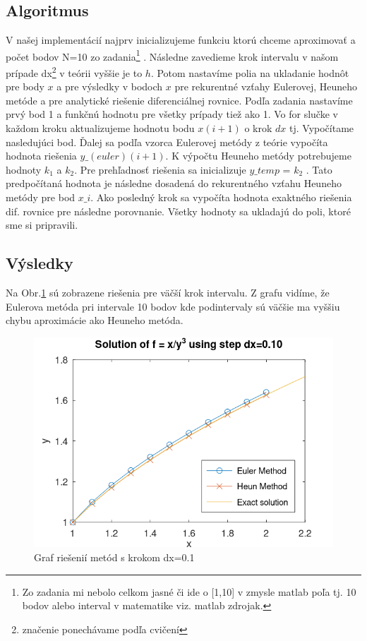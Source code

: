 \documentclass{article}
\theoremstyle{definition}
\theoremstyle{remark}
\begin{document}
\subsection{Algoritmus}
V našej implementácií najprv inicializujeme funkciu ktorú chceme aproximovať a počet bodov N=10 zo zadania\footnote{Zo zadania mi nebolo celkom jasné či ide o [1,10] v zmysle matlab poľa tj. 10 bodov alebo interval v matematike viz. matlab zdrojak.} . Následne zavedieme krok intervalu v našom prípade dx\footnote{značenie ponechávame podľa cvičení} v teórii vyššie je to $h$. Potom nastavíme polia na ukladanie hodnôt pre body $x$ a pre výsledky v bodoch $x$ pre rekurentné vzťahy Eulerovej, Heuneho metóde a pre analytické riešenie diferenciálnej rovnice. Podľa zadania nastavíme prvý bod 1 a funkčnú hodnotu pre všetky prípady tiež ako 1. Vo for slučke v každom kroku aktualizujeme hodnotu bodu $x(i+1)$ o krok $dx$ tj. Vypočítame nasledujúci bod. Ďalej sa podľa vzorca Eulerovej metódy z teórie vypočíta hodnota riešenia $y\_(euler)(i+1)$. K výpočtu Heuneho metódy potrebujeme hodnoty $k_1$ a $k_2$. Pre prehľadnosť riešenia sa inicializuje $y\_temp$ = $k_2$ . Tato predpočítaná hodnota je následne dosadená do rekurentného vzťahu Heuneho metódy pre bod $x\_i$. Ako posledný krok sa vypočíta hodnota exaktného riešenia dif. rovnice pre následne porovnanie. Všetky hodnoty sa ukladajú do poli, ktoré sme si pripravili. 
\subsection{Výsledky}
Na Obr.\ref{fig:dx01} sú zobrazene riešenia pre väčší krok intervalu. Z grafu vidíme, že Eulerova metóda pri intervale 10 bodov kde podintervaly sú väčšie ma vyššiu chybu aproximácie ako Heuneho metóda.
\begin{figure}[H]
  \centering
  \includegraphics[width=1\textwidth]{dx01.png}
  \caption{Graf riešenií metód s krokom dx=0.1}
  \label{fig:dx01}
\end{figure}
\end{document}
